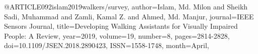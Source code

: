 @ARTICLE{092islam2019walkers/survey,
author={Islam, Md. Milon and Sheikh Sadi, Muhammad and Zamli, Kamal Z. and Ahmed, Md. Manjur},
journal={IEEE Sensors Journal}, 
title={Developing Walking Assistants for Visually Impaired People: A Review}, 
year={2019},
volume={19},
number={8},
pages={2814-2828},
doi={10.1109/JSEN.2018.2890423},
ISSN={1558-1748},
month={April},}